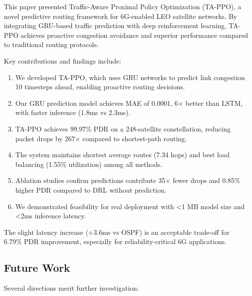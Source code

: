 This paper presented Traffic-Aware Proximal Policy Optimization (TA-PPO), a novel predictive routing framework for 6G-enabled LEO satellite networks. By integrating GRU-based traffic prediction with deep reinforcement learning, TA-PPO achieves proactive congestion avoidance and superior performance compared to traditional routing protocols.

Key contributions and findings include:

\begin{enumerate}
\item We developed TA-PPO, which uses GRU networks to predict link congestion 10 timesteps ahead, enabling proactive routing decisions.

\item Our GRU prediction model achieves MAE of 0.0001, 6$\times$ better than LSTM, with faster inference (1.8ms vs 2.3ms).

\item TA-PPO achieves 99.97\% PDR on a 248-satellite constellation, reducing packet drops by 267$\times$ compared to shortest-path routing.

\item The system maintains shortest average routes (7.34 hops) and best load balancing (1.55\% utilization) among all methods.

\item Ablation studies confirm predictions contribute 35$\times$ fewer drops and 0.85\% higher PDR compared to DRL without prediction.

\item We demonstrated feasibility for real deployment with <1 MB model size and <2ms inference latency.
\end{enumerate}

The slight latency increase (+3.6ms vs OSPF) is an acceptable trade-off for 6.79\% PDR improvement, especially for reliability-critical 6G applications.

\subsection{Future Work}

Several directions merit further investigation:

